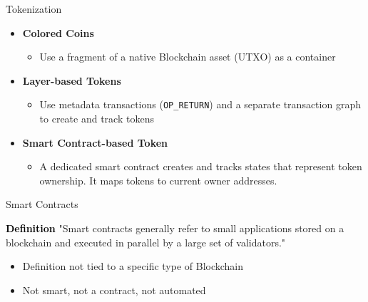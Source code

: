 \documentclass[handout]{beamer}
\begin{document}
\begin{frame}{Tokenization}	
	\begin{itemize}
		\item<1 ->\textbf{Colored Coins}
		\begin{itemize}
			\item<1 ->Use a fragment of a native Blockchain asset (UTXO) as a container
		\end{itemize}
		\vspace{1em}
		\item<2 ->\textbf{Layer-based Tokens}
		\begin{itemize}
			\item<2 -> Use metadata transactions (\texttt{OP\_RETURN}) and a separate transaction graph to create and track tokens
		\end{itemize}
		\vspace{1em}
		\item<3 ->\textbf{Smart Contract-based Token}
		\begin{itemize}
			\item<3 -> A dedicated smart contract creates and tracks states that represent token ownership. It maps tokens to current owner addresses.
		\end{itemize}
	\end{itemize}
\end{frame}


\begin{frame}{Smart Contracts}
	\begin{block}{\textbf{\textcolor{black}{Definition}}}
		"Smart contracts generally refer to small applications stored on a blockchain and executed in parallel by a large
		set of validators."\cite{schar2021defi}
	\end{block}
	\begin{itemize}
		\item<2-> Definition not tied to a specific type of Blockchain
		\item<3-> Not smart, not a contract, not automated
	\end{itemize}
\end{frame}

\end{document}
